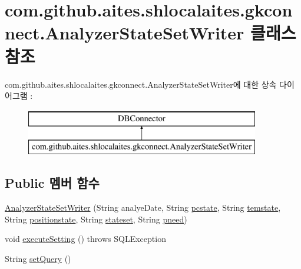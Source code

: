\hypertarget{classcom_1_1github_1_1aites_1_1shlocalaites_1_1gkconnect_1_1_analyzer_state_set_writer}{}\section{com.\+github.\+aites.\+shlocalaites.\+gkconnect.\+Analyzer\+State\+Set\+Writer 클래스 참조}
\label{classcom_1_1github_1_1aites_1_1shlocalaites_1_1gkconnect_1_1_analyzer_state_set_writer}
com.\+github.\+aites.\+shlocalaites.\+gkconnect.\+Analyzer\+State\+Set\+Writer에 대한 상속 다이어그램 \+: \begin{figure}[H]
\begin{center}
\leavevmode
\includegraphics[height=2.000000cm]{classcom_1_1github_1_1aites_1_1shlocalaites_1_1gkconnect_1_1_analyzer_state_set_writer}
\end{center}
\end{figure}
\subsection*{Public 멤버 함수}
\begin{DoxyCompactItemize}
\item 
\mbox{\hyperlink{classcom_1_1github_1_1aites_1_1shlocalaites_1_1gkconnect_1_1_analyzer_state_set_writer_a11068e793e6994d0860def19c92ad3a1}{Analyzer\+State\+Set\+Writer}} (String analye\+Date, String \mbox{\hyperlink{classcom_1_1github_1_1aites_1_1shlocalaites_1_1gkconnect_1_1_analyzer_state_set_writer_ad0d775a45f2ff015d7494105de6968b9}{pcstate}}, String \mbox{\hyperlink{classcom_1_1github_1_1aites_1_1shlocalaites_1_1gkconnect_1_1_analyzer_state_set_writer_a15e54040bff7dcf8339e68642e3b4b8b}{temstate}}, String \mbox{\hyperlink{classcom_1_1github_1_1aites_1_1shlocalaites_1_1gkconnect_1_1_analyzer_state_set_writer_aee7af9c2d37cd631c5ee9e36d9028d11}{positionstate}}, String \mbox{\hyperlink{classcom_1_1github_1_1aites_1_1shlocalaites_1_1gkconnect_1_1_analyzer_state_set_writer_aba9c1043254afe9abe7dfdb8467b03be}{stateset}}, String \mbox{\hyperlink{classcom_1_1github_1_1aites_1_1shlocalaites_1_1gkconnect_1_1_analyzer_state_set_writer_a517da42ac98dcb3578c57ea11f54f8dd}{pneed}})
\item 
void \mbox{\hyperlink{classcom_1_1github_1_1aites_1_1shlocalaites_1_1gkconnect_1_1_analyzer_state_set_writer_a42ae20cbe4a04dbad9c41ba44dcd32d8}{execute\+Setting}} ()  throws S\+Q\+L\+Exception 
\item 
String \mbox{\hyperlink{classcom_1_1github_1_1aites_1_1shlocalaites_1_1gkconnect_1_1_analyzer_state_set_writer_a4995cecdc6c85915bcb3005bf6dc2d8d}{set\+Query}} ()
\end{DoxyCompactItemize}
